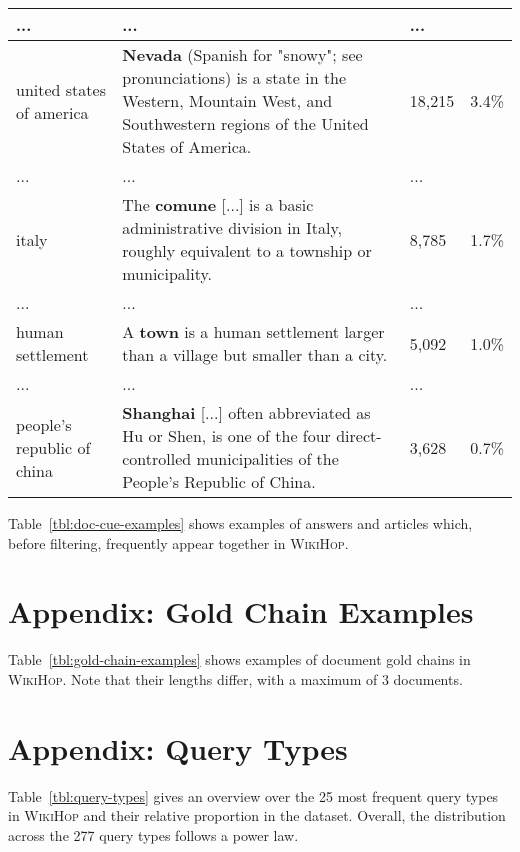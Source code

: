 \documentclass[11pt,letterpaper]{article}
\newcommand{\WikiHop}{\textsc{WikiHop}\xspace}
\begin{document}
\begin{table*}
\begin{tabular}{p{} p{} p{} p{}}
        \midrule
        ... &... &... \\
        \midrule
        united states of america    &  \textbf{Nevada} (Spanish for "snowy"; see pronunciations) is a state in the Western, Mountain West, and Southwestern regions of the United States of America. & 18,215  & 3.4\%  \\
        \midrule
        ... &... &... \\
        \midrule        
        italy    &  The \textbf{comune} [...] is a basic administrative division in Italy, roughly equivalent to a township or municipality.  & 8,785 &  1.7\%  \\ 
        \midrule        
        ... &... &... \\
        \midrule        
        human settlement     &  A \textbf{town} is a human settlement larger than a village but smaller than a city.   & 5,092 & 1.0\%   \\ 
        \midrule        
        ... &... &... \\
        \midrule  
        people's republic of china & \textbf{Shanghai} [...] often abbreviated as Hu or Shen, is one of the four direct-controlled municipalities of the People's Republic of China. & 3,628 & 0.7\% \\ 
        \bottomrule
    \end{tabular}
    \caption{
      Examples with largest  statistic, before filtering.
The \emph{Count} column states ; the last column states the corresponding relative proportion of training samples (total 527,773).
}
    \label{tbl:doc-cue-examples}
\end{table*}
Table~\ref{tbl:doc-cue-examples} shows examples of answers and articles which, before filtering, frequently appear together in \WikiHop.


\section{Appendix: Gold Chain Examples}
Table~\ref{tbl:gold-chain-examples} shows examples of document gold chains in \WikiHop.
Note that their lengths differ, with a maximum of 3 documents.


\section{Appendix: Query Types}
Table~\ref{tbl:query-types} gives an overview over the 25 most frequent query types in \WikiHop and their relative proportion in the dataset.
Overall, the distribution across the 277 query types follows a power law.
\end{document}
